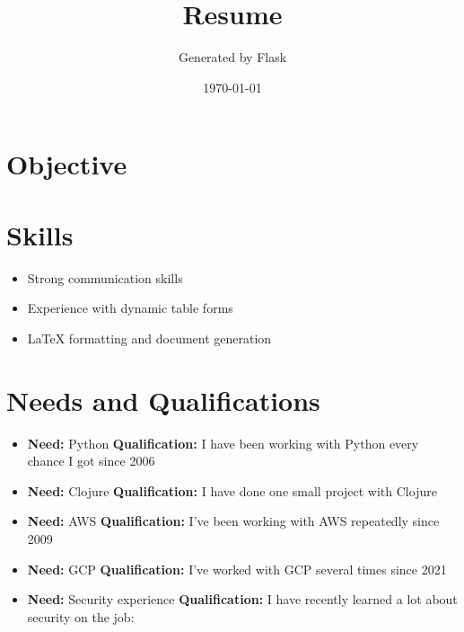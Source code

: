 \documentclass[a4paper,10pt]{article}
\begin{document}
\title{Resume}
\author{Generated by Flask}
\date{\today}
\maketitle

\section*{Objective}

\section*{Skills}
\begin{itemize}
    \item Strong communication skills
    \item Experience with dynamic table forms
    \item LaTeX formatting and document generation
\end{itemize}

\section*{Needs and Qualifications}
\begin{itemize}
    \item \textbf{Need:} Python \textbf{Qualification:} I have been working with Python every chance I got since 2006
    \item \textbf{Need:} Clojure \textbf{Qualification:} I have done one small project with Clojure
    \item \textbf{Need:} AWS \textbf{Qualification:} I've been working with AWS repeatedly since 2009
    \item \textbf{Need:} GCP \textbf{Qualification:} I've worked with GCP several times since 2021
    \item \textbf{Need:} Security experience \textbf{Qualification:} I have recently learned a lot about security on the job:

\end{itemize}
\end{document}

